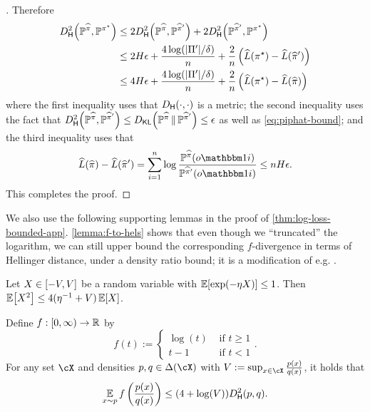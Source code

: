 \begin{proof}[]
Therefore
\begin{align}
\Dhels{\BP^{\pihat}}{\BP^{\pistar}}
&\leq 2\Dhels{\BP^{\pihat}}{\BP^{\pihat'}} + 2\Dhels{\BP^{\pihat'}}{\BP^{\pistar}} \\ 
&\leq 2H\epsilon + \frac{4\log(|\Pi'|/\delta)}{n} + \frac{2}{n}\left(\wh L(\pistar) - \wh L(\pihat')\right) \\ 
&\leq 4H\epsilon + \frac{4\log(|\Pi'|/\delta)}{n} + \frac{2}{n}\left(\wh L(\pistar) - \wh L(\pihat)\right)
\end{align}
where the first inequality uses that $\Dhel{\cdot}{\cdot}$ is a metric; the second inequality uses the fact that $\Dhels{\BP^{\pihat}}{\BP^{\pihat'}} \leq \Dkl{\BP^{\pihat}}{\BP^{\pihat'}} \leq \epsilon$ as well as \cref{eq:piphat-bound}; and the third inequality uses that
\[\wh L(\pihat) - \wh L(\pihat') = \sum_{i=1}^n \log\frac{\BP^{\pihat}(o\ind{i})}{\BP^{\pihat'}(o\ind{i})} \leq nH\epsilon.\]
This completes the proof.
\end{proof}

We also use the following supporting lemmas in the proof of \cref{thm:log-loss-bounded-app}. \cref{lemma:f-to-hels} shows that even though we ``truncated'' the logarithm, we can still upper bound the corresponding $f$-divergence in terms of Hellinger distance, under a density ratio bound; it is a modification of e.g. \cite[Lemma 4]{yang1998asymptotic}.

\begin{lemma}\label{lemma:central-to-bernstein}
  Let $X\in[-V,V]$ be a random variable with
  $\En\brk*{\exp(-\eta{}X)}\leq{}1$. Then $\En\brk*{X^2}\leq{} 4(\eta^{-1}+V)\En\brk*{X}$.
\end{lemma}

\begin{lemma}\label{lemma:f-to-hels}
Define $f: [0,\infty) \to \mathbb{R}$ by 
\[f(t) := \begin{cases} 
\log(t) & \text{ if } t \geq 1 \\ t - 1 & \text{ if } t < 1 
\end{cases}.\]
For any set $\cX$ and densities $p,q \in \Delta(\cX)$ with $V := \sup_{x \in \cX} \frac{p(x)}{q(x)}$, it holds that
\[\EE_{x \sim p} f\left(\frac{p(x)}{q(x)}\right) \leq (4+\log(V)) \Dhels{p}{q}.\]
\end{lemma}

